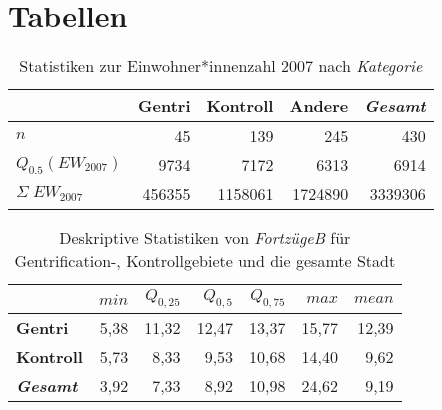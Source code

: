 \newpage
\section{Tabellen}

\begin{table}[H]
\centering
\begin{tabular}{@{}lrrrr@{}}
\toprule
                                       & \multicolumn{1}{r}{{\bf Gentri}} & \multicolumn{1}{r}{{\bf Kontroll}} & \multicolumn{1}{r}{{\bf Andere}} & \multicolumn{1}{r}{{\bf \textit{Gesamt}}} \\ \midrule
$n$                                    & 45                               & 139                                & 245                              & 430                                  \\
$Q_{0.5}(EW_{2007})$                   & 9734                             & 7172                               & 6313                             & 6914                                 \\
$\Sigma\;EW_{2007}$                    & 456355                           & 1158061                            & 1724890                          & 3339306                              \\ \bottomrule
\end{tabular}
\caption{Statistiken zur Einwohner*innenzahl 2007 nach \textit{Kategorie}}\label{tab:KategorieEW}
\end{table}            

\begin{table}[H]
\centering
\begin{tabular}{@{}lrrrrrr@{}}
\toprule
               & $min$ & $Q_{0,25}$ & $Q_{0,5}$ & $Q_{0,75}$ & $max$ & $mean$ \\ \midrule
{\bf Gentri}   & 5,38 & 11,32 & 12,47 & 13,37 & 15,77 & 12,39 \\
{\bf Kontroll} & 5,73 &  8,33 &  9,53 & 10,68 & 14,40 & 9,62 \\ \hdashline 
{\bf \textit{Gesamt}} & 3,92 & 7,33 & 8,92 & 10,98 & 24,62 & 9,19 \\ \bottomrule
\end{tabular}
\caption[Deskriptive Statistiken von \textit{FortzügeB}]{Deskriptive Statistiken von \textit{FortzügeB} für Gentrification-, Kontrollgebiete und die gesamte Stadt}
\label{tab:FortzuegeR}
\end{table}

